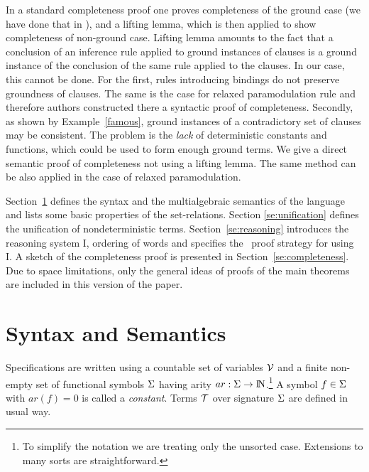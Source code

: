 In a standard completeness proof one
proves completeness of
the ground case (we have done that in \cite {KW}), and a lifting lemma, which is
then applied to show completeness of non-ground case.  Lifting
lemma amounts to the fact 
that a conclusion of an inference rule applied to ground
instances of clauses is a ground instance of the conclusion of the same rule
applied to the clauses.  
In our case, this cannot be done.
For the first, rules introducing bindings do
not preserve groundness of clauses. The same is the case for
relaxed paramodulation rule \cite {relaxed-par} and therefore
authors constructed there a syntactic proof of completeness.  
Secondly, as shown by Example~\ref{famous}, ground
instances of a contradictory set of clauses may be consistent.
The problem is the {\em lack}
of deterministic constants and functions, which could be used to
form enough  ground terms.
We give a direct semantic proof of completeness not using a lifting lemma.
The same method can be also applied in the case of relaxed paramodulation.

Section~\ref{se:nd-specs} defines the syntax and the multialgebraic semantics 
of the language and lists some basic properties of the set-relations. 
Section \ref{se:unification} defines the unification of nondeterministic terms.
Section~\ref{se:reasoning} introduces the reasoning system \C I, ordering of 
words and specifies the \strategy\ proof strategy for using \C I.
A sketch of the completeness proof is presented in
Section~\ref{se:completeness}.
Due to space limitations, only the general ideas of proofs of the main theorems
are included in this version of the paper.


\section{Syntax and Semantics}\label{se:nd-specs}

%
Specifications are written using a countable set of variables ${\cal V}$ and a
finite non-empty set of functional symbols $\Sigma$ having arity
\(ar:\Sigma\to {{\rm I\!N}}\).\footnote{To simplify the notation we are treating only
the unsorted case. Extensions to many sorts are straightforward.}  A symbol
\(f\in\Sigma\) with \(ar(f)=0\) is called a {\em constant}.  Terms ${\cal T}$
over signature $\Sigma$ are defined in usual way. 

